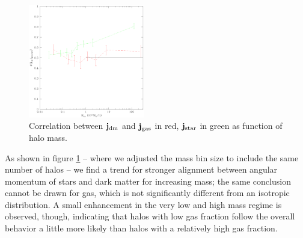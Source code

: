 \documentclass[useAMS,usenatbib]{mn2e}
\begin{document}
%
%
\begin{figure}
  \begin{center}
    \includegraphics[width=0.45\textwidth]{fig/j_dgs_m/out.eps}
  \end{center}

  \caption{ \label{fig:j_dgs_m} Correlation between $\mathbf{j}_{\rm dm}$ and
    $\mathbf{j}_{\rm gas}$ in red, $\mathbf{j}_{\rm star}$ in green as
    function of halo mass.}
\end{figure}
%
%
As shown in figure \ref{fig:j_dgs_m} -- where we adjusted the mass bin size to
include the same number of halos -- we find a trend for stronger alignment
between angular momentum of stars and dark matter for increasing mass; the
same conclusion cannot be drawn for gas, which is not significantly different
from an isotropic distribution. A small enhancement in the very low and high
mass regime is observed, though, indicating that halos with low gas fraction
follow the overall behavior a little more likely than halos with a relatively
high gas fraction.
%
%
\end{document}
